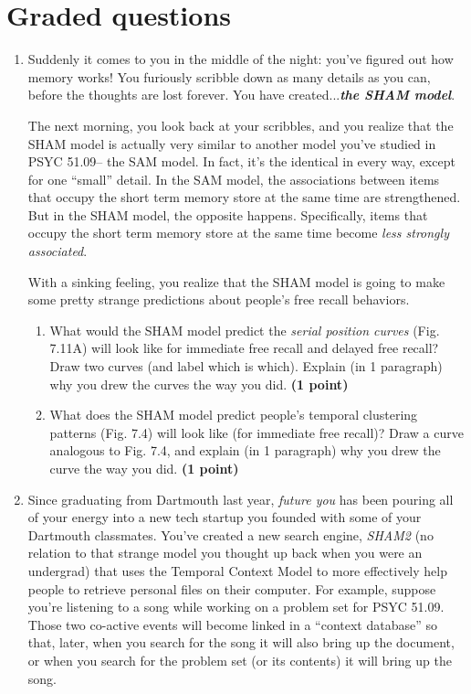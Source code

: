 \documentclass[11pt]{article}
\begin{document}
\section*{Graded questions}
\begin{enumerate}
\item Suddenly it comes to you in the middle of the night: you've figured
  out how memory works!  You furiously scribble down as many details
  as you can, before the thoughts are lost forever.  You have
  created...\textit{\textbf{the SHAM model}}.

The next morning, you look back at your scribbles, and you realize
that the SHAM model is actually very similar to another model you've studied in
PSYC 51.09-- the SAM model.  In fact, it's the identical in every way,
except for one ``small'' detail.  In the SAM model, the associations
between items that occupy the short term memory store at the same time
are strengthened.  But in the SHAM model, the opposite happens.  Specifically,
items that occupy the short term memory store at the same time become
\textit{less strongly associated}.

With a sinking feeling, you realize that the SHAM model is going to
make some pretty strange predictions about people's free recall
behaviors.
\begin{enumerate}
\item What would the SHAM model predict the \textit{serial position
    curves} (Fig. 7.11A) will look like for immediate free recall and
  delayed free recall?  Draw two curves (and label which is which).
  Explain (in 1 paragraph) why you drew the curves the way you
  did.  \textbf{(1 point)}

\item What does the SHAM model predict people's temporal clustering
  patterns (Fig. 7.4) will look like (for immediate free recall)?
  Draw a curve analogous to Fig. 7.4, and explain (in 1 paragraph) why
  you drew the curve the way you did.  \textbf{(1 point)}
\end{enumerate}

\item Since graduating from Dartmouth last year, \textit{future you} has been
  pouring all of your energy into a new tech startup you founded with
  some of your Dartmouth classmates.  You've created a new search
  engine, \textit{SHAM2} (no relation to that strange model you
  thought up back when you were an undergrad) that uses the Temporal
  Context Model to more effectively help people to retrieve personal
  files on their computer.  For example, suppose you're listening to a song
  while working on a problem set for PSYC 51.09.  Those two co-active events will become
  linked in a ``context database'' so that, later, when you search for
  the song it will also bring up the document, or when you search for the
  problem set (or its contents) it will bring up the song.


\end{enumerate}
\end{document}
